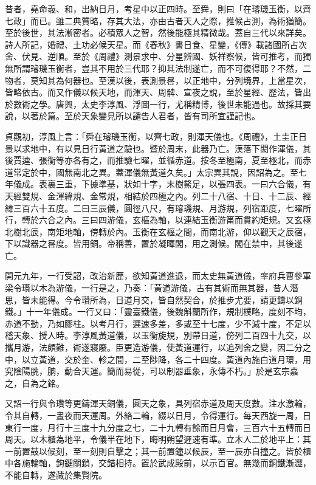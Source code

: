 
\begin{pinyinscope}

 昔者，堯命羲、和，出納日月，考星中以正四時。至舜，則曰「在璿璣玉衡，以齊七政」而已。雖二典質略，存其大法，亦由古者天人之際，推候占測，為術猶簡。至於後世，其法漸密者。必積眾人之智，然後能極其精微哉。蓋自三代以來詳矣。詩人所記，婚禮、土功必候天星。而《春秋》書日食、星變，《傳》載諸國所占次舍、伏見、逆順。至於《周禮》測景求中、分星辨國、妖祥察候，皆可推考，而獨無所謂璿璣玉衡者，豈其不用於三代耶？抑其法制遂亡，而不可復得耶？不然，二物者，莫知其為何器也。至漢以後，表測景晷，以正地中，分列境界，上當星次，皆略依古。而又作儀以候天地，而渾天、周髀、宣夜之說，至於星經、歷法，皆出於數術之學。唐興，太史李淳風、浮圖一行，尤稱精博，後世未能過也。故採其要說，以著於篇。至於天象變見所以譴告人君者，皆有司所宜謹記也。



 貞觀初，淳風上言：「舜在璿璣玉衡，以齊七政，則渾天儀也。《周禮》，土圭正日景以求地中，有以見日行黃道之驗也。暨於周末，此器乃亡。漢落下閎作渾儀，其後賈逵、張衡等亦各有之，而推驗七曜，並循赤道。按冬至極南，夏至極北，而赤道常定於中，國無南北之異。蓋渾儀無黃道久矣。」太宗異其說，因詔為之。至七年儀成。表裏三重，下據準基，狀如十字，末樹鰲足，以張四表。一曰六合儀，有天經雙規、金渾緯規、金常規，相結於四極之內。列二十八宿、十日、十二辰、經緯三百六十五度。二曰三辰儀，圓徑八尺，有璿璣規、月游規，列宿距度，七曜所行，轉於六合之內。三曰四游儀，玄樞為軸，以連結玉衡游筩而貫約矩規。又玄極北樹北辰，南矩地軸，傍轉於內。玉衡在玄樞之間，而南北游，仰以觀天之辰宿，下以識器之晷度。皆用銅。帝稱善，置於凝暉閣，用之測候。閣在禁中，其後遂亡。



 開元九年，一行受詔，改治新歷，欲知黃道進退，而太史無黃道儀，率府兵曹參軍梁令瓚以木為游儀，一行是之，乃奏：「黃道游儀，古有其術而無其器，昔人潛思，皆未能得。今令瓚所為，日道月交，皆自然契合，於推步尤要，請更鑄以銅鐵。」十一年儀成。一行又曰：「靈臺鐵儀，後魏斛蘭所作，規制樸略，度刻不均，赤道不動，乃如膠柱。以考月行，遲速多差，多或至十七度，少不減十度，不足以稽天象、授人時。李淳風黃道儀，以玉衡旋規，別帶日道，傍列二百四十九交，以攜月游，法頗難，術遂寢廢。臣更造游儀，使黃道運行，以追列舍之變，因二分之中，以立黃道，交於奎、軫之間，二至陟降，各二十四度。黃道內施白道月環，用究陰陽朓，朒，動合天運。簡而易從，可以制器垂象，永傳不朽。」於是玄宗嘉之，自為之銘。



 又詔一行與令瓚等更鑄渾天銅儀，圓天之象，具列宿赤道及周天度數。注水激輪，令其自轉，一晝夜而天運周。外絡二輪，綴以日月，令得運行。每天西旋一周，日東行一度，月行十三度十九分度之七，二十九轉有餘而日月會，三百六十五轉而日周天。以木櫃為地平，令儀半在地下，晦明朔望遲速有準。立木人二於地平上：其一前置鼓以候刻，至一刻則自擊之；其一前置鐘以候辰，至一辰亦自撞之。皆於櫃中各施輪軸，鉤鍵關鎖，交錯相持。置於武成殿前，以示百官。無幾而銅鐵漸澀，不能自轉，遂藏於集賢院。




\end{pinyinscope}
